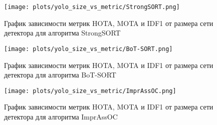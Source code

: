\begin{figure}[ht]
    \centering
    \texttt{[image: plots/yolo\_size\_vs\_metric/StrongSORT.png]}
    \caption{График зависимости метрик HOTA, MOTA и IDF1 от размера сети детектора для алгоритма StrongSORT}
    \label{fig:yolo_StrongSORT}
\end{figure}

\begin{figure}[ht]
    \centering
    \texttt{[image: plots/yolo\_size\_vs\_metric/BoT-SORT.png]}
    \caption{График зависимости метрик HOTA, MOTA и IDF1 от размера сети детектора для алгоритма BoT-SORT}
    \label{fig:yolo_BoT-SORT}
\end{figure}

\begin{figure}[ht]
    \centering
    \texttt{[image: plots/yolo\_size\_vs\_metric/ImprAssOC.png]}
    \caption{График зависимости метрик HOTA, MOTA и IDF1 от размера сети детектора для алгоритма ImprAssOC}
    \label{fig:yolo_ImprAssOC}
\end{figure}
\FloatBarrier



\FloatBarrier